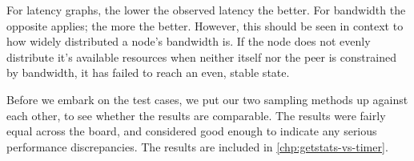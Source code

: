 For latency graphs, the lower the observed latency the better. For bandwidth the opposite applies; the more the better. However, this should be seen in context to how widely distributed a node's bandwidth is. If the node does not evenly distribute it's available resources when neither itself nor the peer is constrained by bandwidth, it has failed to reach an even, stable state.

Before we embark on the test cases, we put our two sampling methods up against each other, to see whether the results are comparable. The results were fairly equal across the board, and considered good enough to indicate any serious performance discrepancies. The results are included in \autoref{chp:getstats-vs-timer}.







